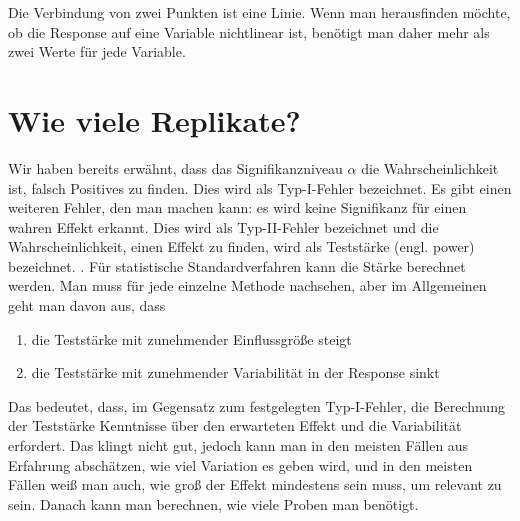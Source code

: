 \documentclass[a4paper,twoside]{tufte-book}\usepackage[]{graphicx}\usepackage[]{color}
\begin{document}
Die Verbindung von zwei Punkten ist eine Linie. Wenn man herausfinden möchte, ob die Response auf eine Variable nichtlinear ist, benötigt man daher mehr als zwei Werte für jede Variable. 


\section{Wie viele Replikate?}

Wir haben bereits erwähnt, dass das Signifikanzniveau $\alpha$ die Wahrscheinlichkeit ist, falsch Positives zu finden. Dies wird als Typ-I-Fehler bezeichnet. Es gibt einen weiteren Fehler, den man machen kann: es wird keine Signifikanz für einen wahren Effekt erkannt. Dies wird als Typ-II-Fehler bezeichnet und die Wahrscheinlichkeit, einen Effekt zu finden, wird als Teststärke (engl. power) bezeichnet. . Für statistische Standardverfahren kann die Stärke berechnet werden. Man muss für jede einzelne Methode nachsehen, aber im Allgemeinen geht man davon aus, dass 

\begin{enumerate}
\item die Teststärke mit zunehmender Einflussgröße steigt 
\item die Teststärke mit zunehmender Variabilität in der Response sinkt
\end{enumerate}

Das bedeutet, dass, im Gegensatz zum festgelegten Typ-I-Fehler, die Berechnung der Teststärke Kenntnisse über den erwarteten Effekt und die Variabilität erfordert. Das klingt nicht gut, jedoch kann man in den meisten Fällen aus Erfahrung abschätzen, wie viel Variation es geben wird, und in den meisten Fällen weiß man auch, wie groß der Effekt mindestens sein muss, um relevant zu sein. Danach kann man berechnen, wie viele Proben man benötigt.
\end{document}
